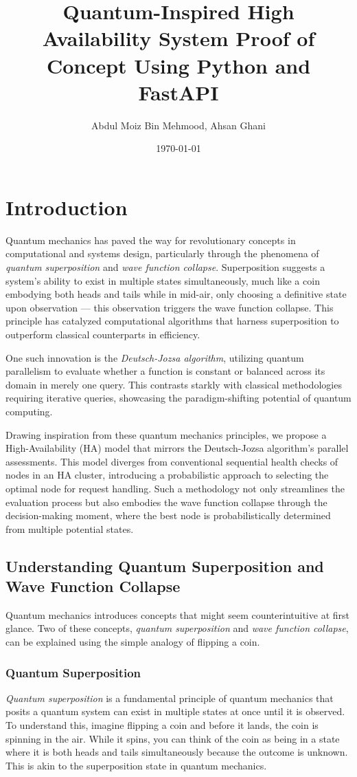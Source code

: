\documentclass[12pt]{article}
\title{Quantum-Inspired High Availability System Proof of Concept Using Python and FastAPI}
\author{Abdul Moiz Bin Mehmood, Ahsan Ghani}
\date{\today}
\begin{document}
\maketitle
\tableofcontents
\newpage

\section{Introduction}
Quantum mechanics has paved the way for revolutionary concepts in computational and systems design, particularly through the phenomena of \textit{quantum superposition} and \textit{wave function collapse}. Superposition suggests a system's ability to exist in multiple states simultaneously, much like a coin embodying both heads and tails while in mid-air, only choosing a definitive state upon observation — this observation triggers the wave function collapse. This principle has catalyzed computational algorithms that harness superposition to outperform classical counterparts in efficiency.

One such innovation is the \textit{Deutsch-Jozsa algorithm}, utilizing quantum parallelism to evaluate whether a function is constant or balanced across its domain in merely one query. This contrasts starkly with classical methodologies requiring iterative queries, showcasing the paradigm-shifting potential of quantum computing.

Drawing inspiration from these quantum mechanics principles, we propose a High-Availability (HA) model that mirrors the Deutsch-Jozsa algorithm's parallel assessments. This model diverges from conventional sequential health checks of nodes in an HA cluster, introducing a probabilistic approach to selecting the optimal node for request handling. Such a methodology not only streamlines the evaluation process but also embodies the wave function collapse through the decision-making moment, where the best node is probabilistically determined from multiple potential states.

\subsection{Understanding Quantum Superposition and Wave Function Collapse}
Quantum mechanics introduces concepts that might seem counterintuitive at first glance. Two of these concepts, \textit{quantum superposition} and \textit{wave function collapse}, can be explained using the simple analogy of flipping a coin.

\subsubsection{Quantum Superposition}
\textit{Quantum superposition} is a fundamental principle of quantum mechanics that posits a quantum system can exist in multiple states at once until it is observed. To understand this, imagine flipping a coin and before it lands, the coin is spinning in the air. While it spins, you can think of the coin as being in a state where it is both heads and tails simultaneously because the outcome is unknown. This is akin to the superposition state in quantum mechanics.
\end{document}
